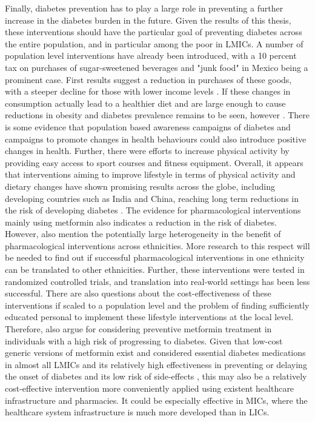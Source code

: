 Finally, diabetes prevention has to play a large role in preventing a further increase in the diabetes burden in the future. Given the results of this thesis, these interventions should have the particular goal of preventing diabetes across the entire population, and in particular among the poor in \acp{LMIC}. A number of population level interventions have already been introduced, with a 10 percent tax on purchases of sugar-sweetened beverages and "junk food" in Mexico being a prominent case. First results suggest a reduction in purchases of these goods, with a steeper decline for those with lower income levels \parencite{Colchero2016,Batis2016}. If these changes in consumption actually lead to a healthier diet and are large enough to cause reductions in obesity and diabetes prevalence remains to be seen, however \parencite{Singh2016}. There is some evidence that population based awareness campaigns of diabetes and campaigns to promote changes in health behaviours could also introduce positive changes in health. Further, there were efforts to increase physical activity by providing easy access to sport courses and fitness equipment. Overall, it appears that interventions aiming to improve lifestyle in terms of physical activity and dietary changes have shown promising results across the globe, including developing countries such as India and China, reaching long term reductions in the risk of developing diabetes \parencite{Cefalu2016}. The evidence for pharmacological interventions mainly using metformin also indicates a reduction in the risk of diabetes. However, \textcite{Cefalu2016} also mention the potentially large heterogeneity in the benefit of pharmacological interventions across ethnicities. More research to this respect will be needed to find out if successful pharmacological interventions in one ethnicity can be translated to other ethnicities. Further, these interventions were tested in randomized controlled trials, and translation into real-world settings has been less successful. There are also questions about the cost-effectiveness of these interventions if scaled to a population level and the problem of finding sufficiently educated personal to implement these lifestyle interventions at the local level. Therefore, \textcite{Cefalu2016} also argue for considering preventive metformin treatment in individuals with a high risk of progressing to diabetes. Given that low-cost generic versions of metformin exist and considered essential diabetes medications in almost all \acp{LMIC} \parencite{Bazargani2014} and its relatively high effectiveness in preventing or delaying the onset of diabetes and its low risk of side-effects \parencite{Gomes2013}, this may also be a relatively cost-effective intervention more conveniently applied using existent healthcare infrastructure and pharmacies. It could be especially effective in \acp{MIC}, where the healthcare system infrastructure is much more developed than in \acp{LIC}.

